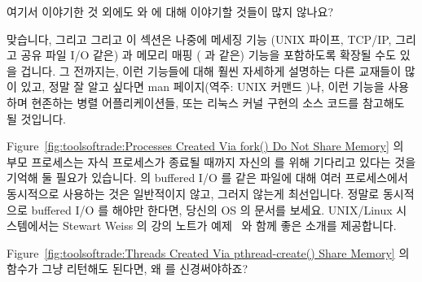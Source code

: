 \begin{enumerate}
\QuickQ{}
	여기서 이야기한 것 외에도  와  에 대해 이야기할
	것들이 많지 않나요?

\QuickA{}
	맞습니다, 그리고 그리고 이 섹션은 나중에 메세징 기능 (UNIX 파이프,
	TCP/IP, 그리고 공유 파일 I/O 같은) 과 메모리 매핑 ( 과
	 같은) 기능을 포함하도록 확장될 수도 있을 겁니다.
	그 전까지는, 이런 기능들에 대해 훨씬 자세하게 설명하는 다른 교재들이
	많이 있고, 정말 잘 알고 싶다면 man 페이지(역주: UNIX 커맨드
	)나, 이런 기능을 사용하며 현존하는 병렬 어플리케이션들, 또는
	리눅스 커널 구현의 소스 코드를 참고해도 될 것입니다.

	Figure~\ref{fig:toolsoftrade:Processes Created Via fork() Do Not Share
	Memory} 의 부모 프로세스는 자식 프로세스가 종료될 때까지 자신의
	 를 위해 기다리고 있다는 것을 기억해 둘 필요가 있습니다.
	 의 buffered I/O 를 같은 파일에 대해 여러 프로세스에서
	동시적으로 사용하는 것은 일반적이지 않고, 그러지 않는게 최선입니다.
	정말로 동시적으로 buffered I/O 를 해야만 한다면, 당신의 OS 의 문서를
	보세요.
	UNIX/Linux 시스템에서는 Stewart Weiss 의 강의 노트가
	예제~\cite{StewartWeiss2013UNIX} 와 함께 좋은 소개를 제공합니다.

\QuickQ{}
	Figure~\ref{fig:toolsoftrade:Threads Created Via pthread-create() Share
	Memory} 의  함수가 그냥 리턴해도 된다면, 왜
	 를 신경써야하죠?


\end{enumerate}
